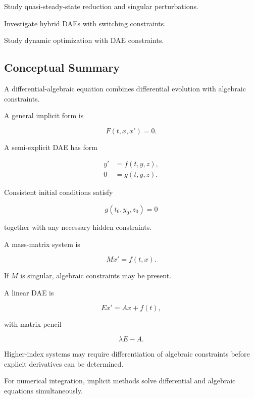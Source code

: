 \begin{exercise}[4]
Study quasi-steady-state reduction and singular perturbations.
\end{exercise}

\begin{exercise}[4]
Investigate hybrid DAEs with switching constraints.
\end{exercise}

\begin{exercise}[4]
Study dynamic optimization with DAE constraints.
\end{exercise}

\subsection{Conceptual Summary}
\label{subsec:dae-summary}

A differential-algebraic equation combines differential evolution with
algebraic constraints.

A general implicit form is

\[
\boxed{
F(t,x,x')=0.
}
\]

A semi-explicit DAE has form

\[
\boxed{
\begin{aligned}
y'&=f(t,y,z),\\
0&=g(t,y,z).
\end{aligned}
}
\]

Consistent initial conditions satisfy

\[
\boxed{
g(t_0,y_0,z_0)=0
}
\]

together with any necessary hidden constraints.

A mass-matrix system is

\[
\boxed{
M x'=f(t,x).
}
\]

If \(M\) is singular, algebraic constraints may be present.

A linear DAE is

\[
\boxed{
E x'=Ax+f(t),
}
\]

with matrix pencil

\[
\boxed{
\lambda E-A.
}
\]

Higher-index systems may require differentiation of algebraic constraints
before explicit derivatives can be determined.

For numerical integration, implicit methods solve differential and
algebraic equations simultaneously.


